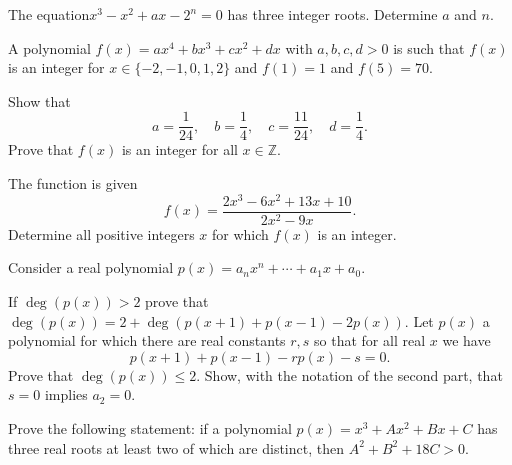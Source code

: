 \begin{question}[name={1970 Dutch Mathematical Olympiad}]
    The equation$ x^3 - x^2 + ax - 2^n = 0$ has three integer roots. Determine $a$ and $n$.
\end{question}

\begin{question}[name={1990 Dutch Mathematical Olympiad}]
    A polynomial $f(x)=ax^4+bx^3+cx^2+dx$ with $ a,b,c,d>0$ is such that $ f(x)$ is an integer for $ x \in \{ -2,-1,0,1,2 \}$ and $ f(1)=1$ and $ f(5)=70$.
    \begin{tasks}
        \task Show that \[a=\frac{1}{24}, \quad b=\frac{1}{4},\quad c=\frac{11}{24}, \quad d=\frac{1}{4}.\]
        \task Prove that $f(x)$ is an integer for all $ x \in \mathbb{Z}$.
    \end{tasks}
\end{question}


\begin{question}[name={2001 Dutch Mathematical Olympiad}]
    The function is given
    \[f(x) = \frac{2x^3 -6x^2 + 13x + 10}{2x^2 - 9x}.\]
    Determine all positive integers $x$ for which $f(x)$ is an integer.
\end{question}

\begin{question}[name={1996 Belgium Flanders}]
    Consider a real polynomial $p(x)=a_nx^n+\cdots+a_1x+a_0$.
    \begin{tasks}
        \task If $\deg(p(x))>2$ prove that $\deg(p(x)) = 2 + \deg(p(x+1)+p(x-1)-2p(x))$.
        \task Let $p(x)$ a polynomial for which there are real constants $r,s$ so that for all real $x$ we have\[ p(x+1)+p(x-1)-rp(x)-s=0. \] Prove that $\deg(p(x))\le 2$.
        \task Show, with the notation of the second part, that $s=0$ implies $a_2=0$.
    \end{tasks}
\end{question}

\begin{question}[name={1996 Germany}]
    Prove the following statement: if a polynomial $p(x) = x^3 + Ax^2 + Bx +C$ has three real roots at least two of which are distinct, then $A^2 +B^2 +18C > 0$.
\end{question}

